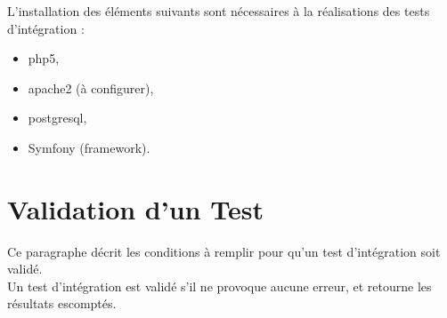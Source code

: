 	  L'installation des éléments suivants sont nécessaires à la réalisations des tests d'intégration : 
	  \begin{itemize}
	  	\item php5,
	  	\item apache2 (à configurer),
	  	\item postgresql,
	  	\item Symfony (framework).
	  \end{itemize}
  
  \section{Validation d'un Test}
	Ce paragraphe décrit les conditions à remplir pour qu'un test d'intégration soit validé.\\
  
  	Un test d'intégration est validé s'il ne provoque aucune erreur, et retourne les résultats escomptés. 
  	
  	